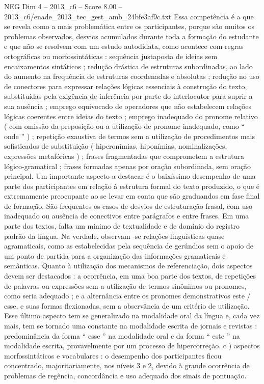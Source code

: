 \begin{textsample}{NEG Dim 4 – 2013\_c6 – Score 8.00 – 2013\_c6/enade\_2013\_tec\_gest\_amb\_24bfe3af9c.txt}
Essa competência é a que se revela como a mais problemática entre os participantes, porque são muitos os problemas observados, desvios acumulados durante toda a formação do estudante e que não se resolvem com um estudo autodidata, como acontece com regras ortográficas ou morfossintáticas : sequência justaposta de ideias sem encaixamentos sintáticos ; redução drástica de estruturas subordinadas, ao lado do aumento na frequência de estruturas coordenadas e absolutas ; redução no uso de conectores para expressar relações lógicas essenciais à construção do texto, substituídas pela exigência de inferência por parte do interlocutor para suprir a sua ausência ; emprego equivocado de operadores que não estabelecem relações lógicas coerentes entre ideias do texto ; emprego inadequado do pronome relativo ( com omissão da preposição ou a utilização de pronome inadequado, como “ onde ” ) ; repetição exaustiva de termos sem a utilização de procedimentos mais sofisticados de substituição ( hiperonímias, hiponímias, nominalizações, expressões metafóricas ) ; frases fragmentadas que comprometem a estrutura lógico-gramatical ; frases formadas apenas por oração subordinada, sem oração principal.
Um importante aspecto a destacar é o baixíssimo desempenho de uma parte dos participantes em relação à estrutura formal do texto produzido, o que é extremamente preocupante ao se levar em conta que são graduandos em fase final de formação.
São frequentes os casos de desvios de estruturação frasal, com uso inadequado ou ausência de conectivos entre parágrafos e entre frases.
Em uma parte dos textos, falta um mínimo de textualidade e de domínio do registro padrão da língua.
Na verdade, observam -se relações linguísticas quase agramaticais, como as estabelecidas pela sequência de gerúndios sem o apoio de um ponto de partida para a organização das informações gramaticais e semânticas.
Quanto à utilização dos mecanismos de referenciação, dois aspectos devem ser destacados : a ocorrência, em uma boa parte dos textos, de repetições de palavras ou expressões sem a utilização de termos sinônimos ou pronomes, como seria adequado ; e a alternância entre os pronomes demonstrativos este / esse, e suas formas flexionadas, sem a observância de um critério de utilização.
Esse último aspecto tem se generalizado na modalidade oral da língua e, cada vez mais, tem se tornado uma constante na modalidade escrita de jornais e revistas : predominância da forma “ esse ” na modalidade oral e da forma “ este ” na modalidade escrita, provavelmente por um processo de hipercorreção. c ) aspectos morfossintáticos e vocabulares : o desempenho dos participantes ficou concentrado, majoritariamente, nos níveis 3 e 2, devido à grande ocorrência de problemas de regência, concordância e uso adequado dos sinais de pontuação.

\end{textsample}
